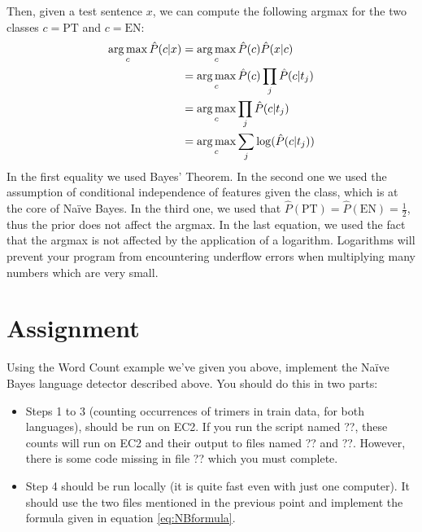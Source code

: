 Then, given a test sentence $x$, we can compute the following argmax for the two classes $c = \text{PT}$ and $c = \text{EN}$:
%
\begin{eqnarray}
\operatorname*{arg\,max}_c {\hat P}(c | x) &= \operatorname*{arg\,max}_c {\hat P}(c) {\hat P}(x | c) \nonumber\\
&= \operatorname*{arg\,max}_c {\hat P}(c) \prod_j {\hat P}(c | t_j) \nonumber\\
&= \operatorname*{arg\,max}_c \prod_j {\hat P}(c | t_j) \nonumber\\
&= \operatorname*{arg\,max}_c \sum_j \log({\hat P}(c | t_j))\label{eq:NBformula}
\end{eqnarray}
%
In the first equality we used Bayes' Theorem. In the second one we used the assumption of conditional independence of features given the class, which is at the core of Na\"{i}ve Bayes. In the third one, we used that ${\hat P}(\text{PT}) = {\hat P}(\text{EN}) = \frac{1}{2}$, thus the prior does not affect the argmax. In the last equation, we used the fact that the argmax is not affected by the application of a logarithm. Logarithms will prevent your program from encountering underflow errors when multiplying many numbers which are very small.

\section{Assignment}

Using the Word Count example we've given you above, implement the Na\"{i}ve Bayes language detector described above. You should do this in two parts:

\begin{itemize}
	\item Steps 1 to 3 (counting occurrences of trimers in train data, for both languages), should be run on EC2. If you run the script named ??, these counts will run on EC2 and their output to files named ?? and ??. However, there is some code missing in file ?? which you must complete.
	\item Step 4 should be run locally (it is quite fast even with just one computer). It should use the two files mentioned in the previous point and implement the formula given in equation \eqref{eq:NBformula}.
\end{itemize}

%
%
%
%

